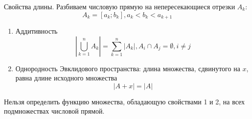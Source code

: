 Свойства длины. Разбиваем числовую прямую на непересекающиеся отрезки $A_k$:
        $$A_k=\left[a_k;b_k\right], a_k < b_k < a_{k+1}$$
\begin{enumerate}
    \item Аддитивность
        $$\left|\bigcup_{k=1}^n A_k\right|
        =\sum_{k=1}^n\left|A_k\right| , A_i\cap A_j=\emptyset, i\neq j$$
    \item Однородность Эвклидового пространства:
        длина множества, сдвинутого на $x$, равна длине исходного множества
        $$\left|A+x\right|=\left|A\right|$$
\end{enumerate}
\begin{affirmation}
    Нельзя определить функцию множества, обладающую свойствами 1 и 2,
    на всех подмножествах числовой прямой.
\end{affirmation}
